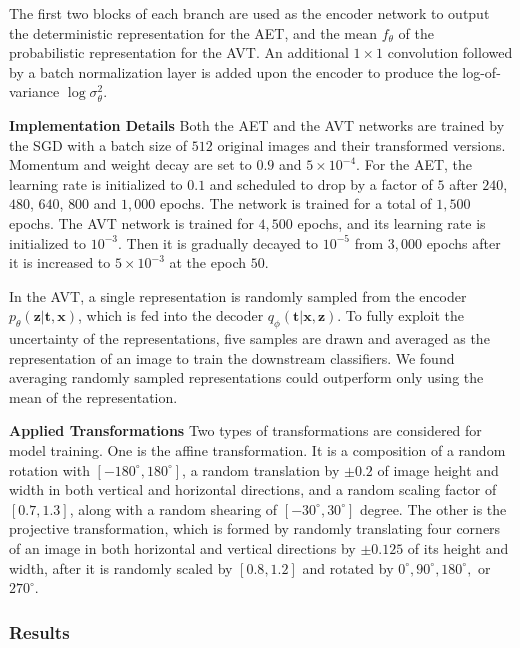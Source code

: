 \documentclass[10pt,journal,compsoc,twoside]{IEEEtran}
\begin{document}
The first two blocks of each branch are used as the encoder network to output the deterministic representation for the AET, and the mean $f_\theta$ of the probabilistic representation for the AVT. An additional $1\times 1$ convolution followed by a batch normalization layer is added upon the encoder to produce the log-of-variance $\log\sigma_\theta^2$.


\vspace{2mm}
{\noindent\bf Implementation Details} Both the AET and the AVT networks are trained by the SGD with a batch size of $512$ original images and their transformed versions. Momentum and weight decay are set to $0.9$ and $5\times 10^{-4}$. For the AET, the learning rate is initialized to $0.1$ and scheduled to drop by a factor of $5$ after $240$, $480$, $640$, $800$ and $1,000$ epochs. The network is trained for a total of $1,500$ epochs. The AVT network is trained for $4,500$ epochs, and its learning rate is initialized to $10^{-3}$. Then it is gradually decayed to $10^{-5}$ from $3,000$ epochs after it is increased to $5\times 10^{-3}$ at the epoch $50$.

In the AVT, a single representation is randomly sampled from the encoder $p_\theta(\mathbf z|\mathbf t,\mathbf x)$, which is fed into the decoder $q_\phi(\mathbf t|\mathbf x, \mathbf z)$. To fully exploit the uncertainty of the representations, five samples are drawn and averaged as the representation of an image to train the downstream classifiers. We found averaging randomly sampled representations could outperform only using the mean of the representation.

\vspace{2mm}
{\noindent\bf Applied Transformations} Two types of transformations are considered for model training.
One is the affine transformation. It is a composition of a random rotation with $[-180^\circ, 180^\circ]$, a random translation by $\pm 0.2$ of image height and width in both vertical and horizontal directions, and a random scaling factor of $[0.7, 1.3]$, along with a random shearing of $[-30^\circ,30^\circ]$ degree.
The other is the projective transformation, which is formed by
randomly translating four corners of an image in both horizontal and vertical directions by $\pm 0.125$ of its height and width, after it is randomly scaled by $[0.8, 1.2]$ and rotated by $0^\circ, 90^\circ, 180^\circ,$ or $270^\circ$.

\subsubsection{Results}
\end{document}
